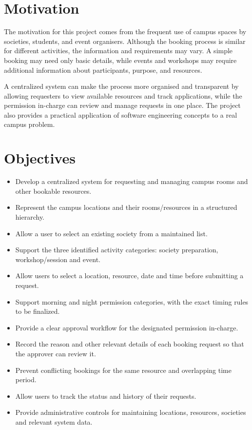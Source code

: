 \documentclass[12pt]{article}
\begin{document}
\section{Motivation}
The motivation for this project comes from the frequent use of campus spaces by societies, students, and event organisers. Although the booking process is similar for different activities, the information and requirements may vary. A simple booking may need only basic details, while events and workshops may require additional information about participants, purpose, and resources.

A centralized system can make the process more organised and transparent by allowing requesters to view available resources and track applications, while the permission in-charge can review and manage requests in one place. The project also provides a practical application of software engineering concepts to a real campus problem.

\section{Objectives}
\begin{itemize}
    \item Develop a centralized system for requesting and managing campus rooms and other bookable resources.
    \item Represent the campus locations and their rooms/resources in a structured hierarchy.
    \item Allow a user to select an existing society from a maintained list.
    \item Support the three identified activity categories: society preparation, workshop/session and event.
    \item Allow users to select a location, resource, date and time before submitting a request.
    \item Support morning and night permission categories, with the exact timing rules to be finalized.
    \item Provide a clear approval workflow for the designated permission in-charge.
    \item Record the reason and other relevant details of each booking request so that the approver can review it.
    \item Prevent conflicting bookings for the same resource and overlapping time period.
    \item Allow users to track the status and history of their requests.
    \item Provide administrative controls for maintaining locations, resources, societies and relevant system data.
\end{itemize}
\end{document}
